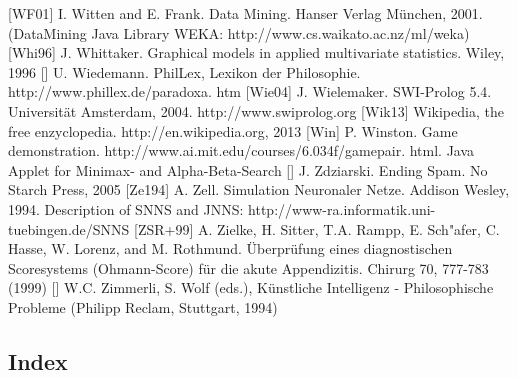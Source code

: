\documentclass[10pt]{book}
\begin{document}
[WF01] I. Witten and E. Frank. Data Mining. Hanser Verlag München, 2001. (DataMining Java Library WEKA: http://www.cs.waikato.ac.nz/ml/weka)
[Whi96] J. Whittaker. Graphical models in applied multivariate statistics. Wiley, 1996
[\cite{wiedemannPhillex}] U. Wiedemann. PhilLex, Lexikon der Philosophie. http://www.phillex.de/paradoxa. htm
[Wie04] J. Wielemaker. SWI-Prolog 5.4. Universität Amsterdam, 2004. http://www.swiprolog.org
[Wik13] Wikipedia, the free enzyclopedia. http://en.wikipedia.org, 2013
[Win] P. Winston. Game demonstration. http://www.ai.mit.edu/courses/6.034f/gamepair. html. Java Applet for Minimax- and Alpha-Beta-Search
[\cite{zdziarski2005ending}] J. Zdziarski. Ending Spam. No Starch Press, 2005
[Ze194] A. Zell. Simulation Neuronaler Netze. Addison Wesley, 1994. Description of SNNS and JNNS: http://www-ra.informatik.uni-tuebingen.de/SNNS
[ZSR+99] A. Zielke, H. Sitter, T.A. Rampp, E. Sch"afer, C. Hasse, W. Lorenz, and M. Rothmund. Überprüfung eines diagnostischen Scoresystems (Ohmann-Score) für die akute Appendizitis. Chirurg 70, 777-783 (1999)
[\cite{zimmerli1994ki}] W.C. Zimmerli, S. Wolf (eds.), Künstliche Intelligenz - Philosophische Probleme (Philipp Reclam, Stuttgart, 1994)
\subsection{Index}
\end{document}
